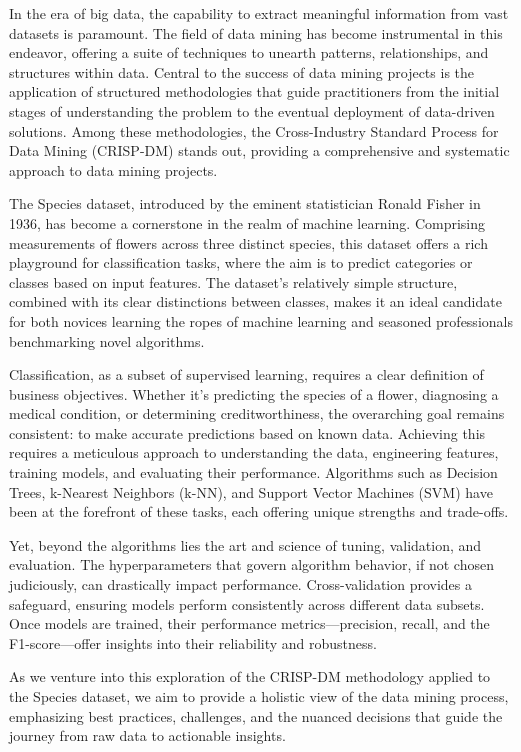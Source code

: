 \documentclass{article}
\begin{document}
In the era of big data, the capability to extract meaningful information from vast datasets is paramount. The field of data mining has become instrumental in this endeavor, offering a suite of techniques to unearth patterns, relationships, and structures within data. Central to the success of data mining projects is the application of structured methodologies that guide practitioners from the initial stages of understanding the problem to the eventual deployment of data-driven solutions. Among these methodologies, the Cross-Industry Standard Process for Data Mining (CRISP-DM) stands out, providing a comprehensive and systematic approach to data mining projects.

The Species dataset, introduced by the eminent statistician Ronald Fisher in 1936, has become a cornerstone in the realm of machine learning. Comprising measurements of flowers across three distinct species, this dataset offers a rich playground for classification tasks, where the aim is to predict categories or classes based on input features. The dataset's relatively simple structure, combined with its clear distinctions between classes, makes it an ideal candidate for both novices learning the ropes of machine learning and seasoned professionals benchmarking novel algorithms.

Classification, as a subset of supervised learning, requires a clear definition of business objectives. Whether it's predicting the species of a flower, diagnosing a medical condition, or determining creditworthiness, the overarching goal remains consistent: to make accurate predictions based on known data. Achieving this requires a meticulous approach to understanding the data, engineering features, training models, and evaluating their performance. Algorithms such as Decision Trees, k-Nearest Neighbors (k-NN), and Support Vector Machines (SVM) have been at the forefront of these tasks, each offering unique strengths and trade-offs.

Yet, beyond the algorithms lies the art and science of tuning, validation, and evaluation. The hyperparameters that govern algorithm behavior, if not chosen judiciously, can drastically impact performance. Cross-validation provides a safeguard, ensuring models perform consistently across different data subsets. Once models are trained, their performance metrics—precision, recall, and the F1-score—offer insights into their reliability and robustness.

As we venture into this exploration of the CRISP-DM methodology applied to the Species dataset, we aim to provide a holistic view of the data mining process, emphasizing best practices, challenges, and the nuanced decisions that guide the journey from raw data to actionable insights.
\end{document}
